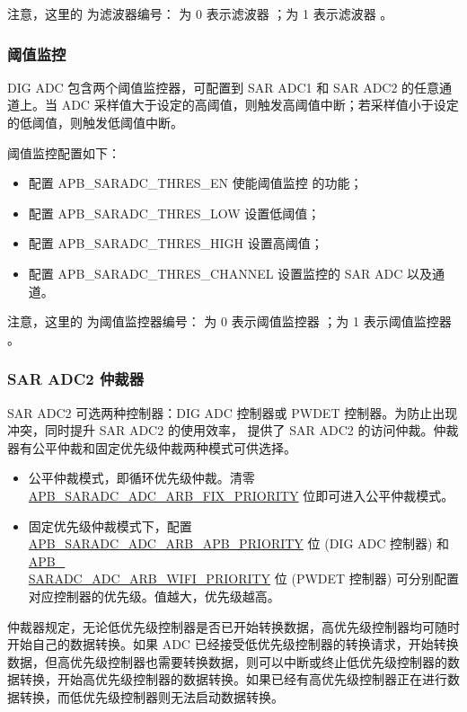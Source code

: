 \documentclass[main\_\_CN.tex]{subfiles}
\begin{document}
注意，这里的  为滤波器编号： 为 0 表示滤波器 ；为 1 表示滤波器 。

\subsubsection{阈值监控}
DIG ADC 包含两个阈值监控器，可配置到 SAR ADC1 和 SAR ADC2 的任意通道上。当 ADC 采样值大于设定的高阈值，则触发高阈值中断；若采样值小于设定的低阈值，则触发低阈值中断。

阈值监控配置如下：
\begin{itemize}
    \item 配置 APB\_SARADC\_THRES\_EN 使能阈值监控  的功能；
    \item 配置 APB\_SARADC\_THRES\_LOW 设置低阈值；
    \item 配置 APB\_SARADC\_THRES\_HIGH 设置高阈值；
    \item 配置 APB\_SARADC\_THRES\_CHANNEL 设置监控的 SAR ADC 以及通道。
\end{itemize}

注意，这里的  为阈值监控器编号： 为 0 表示阈值监控器 ；为 1 表示阈值监控器 。

\subsubsection{SAR ADC2 仲裁器}

SAR ADC2 可选两种控制器：DIG ADC 控制器或 PWDET 控制器。为防止出现冲突，同时提升 SAR ADC2 的使用效率，\chipname{} 提供了 SAR ADC2 的访问仲裁。仲裁器有公平仲裁和固定优先级仲裁两种模式可供选择。

\begin{itemize}
    \item 公平仲裁模式，即循环优先级仲裁。清零 \hyperref[fielddesc:APBSARADCADCARBFIXPRIORITY]{APB\_SARADC\_ADC\_ARB\_FIX\_PRIORITY} 位即可进入公平仲裁模式。
    \item 固定优先级仲裁模式下，配置 \hyperref[fielddesc:APBSARADCADCARBAPBPRIORITY]{APB\_SARADC\_ADC\_ARB\_APB\_PRIORITY} 位 (DIG ADC 控制器) 和 \hyperref[fielddesc:APBSARADCADCARBWIFIPRIORITY]{APB\_\\SARADC\_ADC\_ARB\_WIFI\_PRIORITY} 位 (PWDET 控制器) 
   可分别配置对应控制器的优先级。值越大，优先级越高。
\end{itemize}


仲裁器规定，无论低优先级控制器是否已开始转换数据，高优先级控制器均可随时开始自己的数据转换。如果 ADC 已经接受低优先级控制器的转换请求，开始转换数据，但高优先级控制器也需要转换数据，则可以中断或终止低优先级控制器的数据转换，开始高优先级控制器的数据转换。如果已经有高优先级控制器正在进行数据转换，而低优先级控制器则无法启动数据转换。
\end{document}
